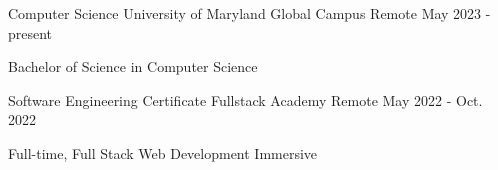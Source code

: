 

\begin{cventries}

 \cventry
    {Computer Science} %
    {University of Maryland Global Campus} %
    {Remote} %
    {May 2023 - present} %
     {
       \begin{cvitems} %
        \item {Bachelor of Science in Computer Science}
      \end{cvitems}
    }

 \cventry
    {Software Engineering Certificate} %
    {Fullstack Academy} %
    {Remote} %
    {May 2022 - Oct. 2022} %
    {
       \begin{cvitems} %
        \item {Full-time, Full Stack Web Development Immersive}
      \end{cvitems}
    }

\end{cventries}
